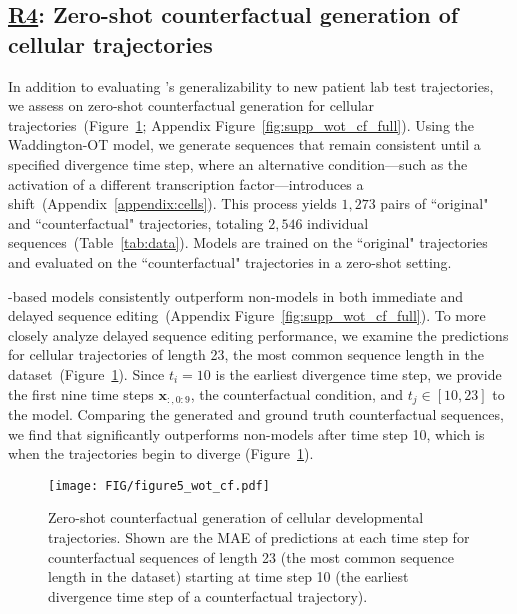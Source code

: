 \subsection{\underline{R4}: Zero-shot counterfactual generation of cellular trajectories}

In addition to evaluating \name's generalizability to new patient lab test trajectories, we assess on zero-shot counterfactual generation for cellular trajectories~(Figure~\ref{fig:wot_cf}; Appendix Figure~\ref{fig:supp_wot_cf_full}). Using the Waddington-OT model, we generate sequences that remain consistent until a specified divergence time step, where an alternative condition—such as the activation of a different transcription factor—introduces a shift~(Appendix~\ref{appendix:cells}). This process yields \(1,273\) pairs of ``original" and ``counterfactual" trajectories, totaling \(2,546\) individual sequences~(Table~\ref{tab:data}). Models are trained on the ``original" trajectories and evaluated on the ``counterfactual" trajectories in a zero-shot setting.

\name-based models consistently outperform non-\name models in both immediate and delayed sequence editing~(Appendix Figure~\ref{fig:supp_wot_cf_full}). To more closely analyze delayed sequence editing performance, we examine the predictions for cellular trajectories of length 23, the most common sequence length in the dataset~(Figure~\ref{fig:wot_cf}). Since \(t_i = 10\) is the earliest divergence time step, we provide the first nine time steps \(\mathbf{x}_{:,0:9}\), the counterfactual condition, and \(t_j \in [10, 23]\) to the model. Comparing the generated and ground truth counterfactual sequences, we find that \name significantly outperforms non-\name models after time step 10, which is when the trajectories begin to diverge (Figure~\ref{fig:wot_cf}). 







\begin{figure}[ht]
\begin{center}
\centerline{\texttt{[image: FIG/figure5\_wot\_cf.pdf]}}
\caption{Zero-shot counterfactual generation of cellular developmental trajectories. Shown are the MAE of predictions at each time step for counterfactual sequences of length 23 (the most common sequence length in the dataset) starting at time step 10 (the earliest divergence time step of a counterfactual trajectory).}
\label{fig:wot_cf}
\end{center}
\vskip -0.35in
\end{figure}


